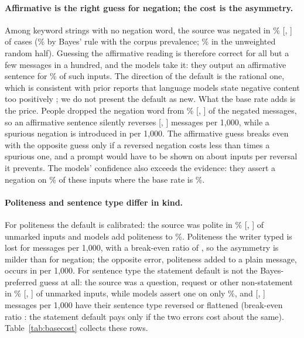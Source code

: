\paragraph{Affirmative is the right guess for negation; the cost is the asymmetry.}
Among keyword strings with no negation word, the source was negated in \jmtTwoPostPol{}\% [\jmtTwoPostPolLo{}, \jmtTwoPostPolHi{}] of cases (\jmtTwoPostBayesPol{}\% by Bayes' rule with the corpus prevalence; \jmtTwoPolRandHalf{}\% in the unweighted random half). Guessing the affirmative reading is therefore correct for all but a few messages in a hundred, and the models take it: they output an affirmative sentence for \jmtTwoAffGivenNoNeg{}\% of such inputs. The direction of the default is the rational one, which is consistent with prior reports that language models state negative content too positively \cite{chen2023say}; we do not present the default as new. What the base rate adds is the price. People dropped the negation word from \jmtTwoDroppedPol{}\% [\jmtTwoDroppedPolLo{}, \jmtTwoDroppedPolHi{}] of the negated messages, so an affirmative sentence silently reverses \jmtTwoRevPol{} [\jmtTwoRevPolLo{}, \jmtTwoRevPolHi{}] messages per 1,000, while a spurious negation is introduced in \jmtTwoSpurPol{} per 1,000. The affirmative guess breaks even with the opposite guess only if a reversed negation costs less than \jmtTwoBreakPol{} times a spurious one, and a prompt would have to be shown on about \jmtTwoQueriesPol{} inputs per reversal it prevents. The models' confidence also exceeds the evidence: they assert a negation on \jmtTwoModelCuePol{}\% of these inputs where the base rate is \jmtTwoPostPol{}\%.

\paragraph{Politeness and sentence type differ in kind.}
For politeness the default is calibrated: the source was polite in \jmtTwoPostPolite{}\% [\jmtTwoPostPoliteLo{}, \jmtTwoPostPoliteHi{}] of unmarked inputs and models add politeness to \jmtTwoModelCuePolite{}\%. Politeness the writer typed is lost for \jmtTwoRevPolite{} messages per 1,000, with a break-even ratio of \jmtTwoBreakPolite{}, so the asymmetry is milder than for negation; the opposite error, politeness added to a plain message, occurs in \jmtTwoSpurPolite{} per 1,000. For sentence type the statement default is not the Bayes-preferred guess at all: the source was a question, request or other non-statement in \jmtTwoPostAct{}\% [\jmtTwoPostActLo{}, \jmtTwoPostActHi{}] of unmarked inputs, while models assert one on only \jmtTwoModelCueAct{}\%, and \jmtTwoRevAct{} [\jmtTwoRevActLo{}, \jmtTwoRevActHi{}] messages per 1,000 have their sentence type reversed or flattened (break-even ratio \jmtTwoBreakAct{}: the statement default pays only if the two errors cost about the same).
Table~\ref{tab:basecost} collects these rows.


